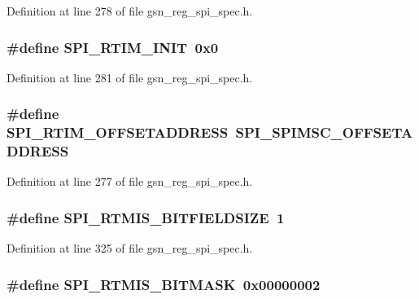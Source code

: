 Definition at line 278 of file gsn\_\-reg\_\-spi\_\-spec.h.

\hypertarget{a00573_a92d40cfc57918105d17238c10b8e492e}{
\subsubsection[{SPI\_\-RTIM\_\-INIT}]{\setlength{\rightskip}{0pt plus 5cm}\#define SPI\_\-RTIM\_\-INIT~0x0}}
\label{a00573_a92d40cfc57918105d17238c10b8e492e}


Definition at line 281 of file gsn\_\-reg\_\-spi\_\-spec.h.

\hypertarget{a00573_a4deec936b62e0546923d51a33a47ce31}{
\subsubsection[{SPI\_\-RTIM\_\-OFFSETADDRESS}]{\setlength{\rightskip}{0pt plus 5cm}\#define SPI\_\-RTIM\_\-OFFSETADDRESS~SPI\_\-SPIMSC\_\-OFFSETADDRESS}}
\label{a00573_a4deec936b62e0546923d51a33a47ce31}


Definition at line 277 of file gsn\_\-reg\_\-spi\_\-spec.h.

\hypertarget{a00573_a5f955c5f3c09ec35af280ac192a5925a}{
\subsubsection[{SPI\_\-RTMIS\_\-BITFIELDSIZE}]{\setlength{\rightskip}{0pt plus 5cm}\#define SPI\_\-RTMIS\_\-BITFIELDSIZE~1}}
\label{a00573_a5f955c5f3c09ec35af280ac192a5925a}


Definition at line 325 of file gsn\_\-reg\_\-spi\_\-spec.h.

\hypertarget{a00573_afdd65a70f35d843a6fbfa6bf8c1895f4}{
\subsubsection[{SPI\_\-RTMIS\_\-BITMASK}]{\setlength{\rightskip}{0pt plus 5cm}\#define SPI\_\-RTMIS\_\-BITMASK~0x00000002}}
\label{a00573_afdd65a70f35d843a6fbfa6bf8c1895f4}


